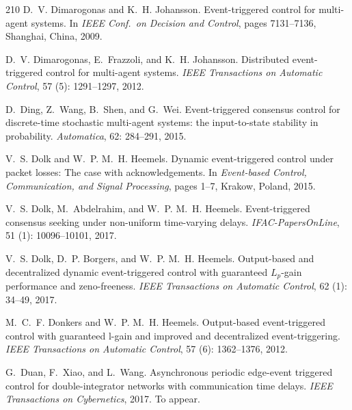 \documentclass{autart}
\begin{document}
{\begin{thebibliography}{210}
D.~V. Dimarogonas and K.~H. Johansson.
\newblock Event-triggered control for multi-agent systems.
\newblock In \emph{{IEEE} Conf.\ on Decision and Control}, pages 7131--7136,
  Shanghai, China, 2009.

D.~V. Dimarogonas, E.~Frazzoli, and K.~H. Johansson.
\newblock Distributed event-triggered control for multi-agent systems.
\newblock \emph{IEEE Transactions on Automatic Control}, 57
  (5): 1291--1297, 2012.

D.~Ding, Z.~Wang, B.~Shen, and G.~Wei.
\newblock Event-triggered consensus control for discrete-time stochastic
  multi-agent systems: the input-to-state stability in probability.
\newblock \emph{Automatica}, 62: 284--291, 2015.

V.~S. Dolk and W.~P. M.~H. Heemels.
\newblock Dynamic event-triggered control under packet losses: The case with
  acknowledgements.
\newblock In \emph{Event-based Control, Communication, and Signal Processing},
  pages 1--7, Krakow, Poland, 2015.

V.~S. Dolk, M.~Abdelrahim, and W.~P. M.~H. Heemels.
\newblock Event-triggered consensus seeking under non-uniform time-varying
  delays.
\newblock \emph{IFAC-PapersOnLine}, 51 (1): 10096--10101,
  2017{}.

V.~S. Dolk, D.~P. Borgers, and W.~P. M.~H. Heemels.
\newblock Output-based and decentralized dynamic event-triggered control with
  guaranteed {$L_p$-gain} performance and zeno-freeness.
\newblock \emph{IEEE Transactions on Automatic Control}, 62
  (1): 34--49, 2017{}.

M.~C.~F. Donkers and W.~P. M.~H. Heemels.
\newblock Output-based event-triggered control with guaranteed l-gain and
  improved and decentralized event-triggering.
\newblock \emph{IEEE Transactions on Automatic Control}, 57
  (6): 1362--1376, 2012.

G.~Duan, F.~Xiao, and L.~Wang.
\newblock Asynchronous periodic edge-event triggered control for
  double-integrator networks with communication time delays.
\newblock \emph{IEEE Transactions on Cybernetics}, 2017.
\newblock To appear.


\end{thebibliography}}
\end{document}
